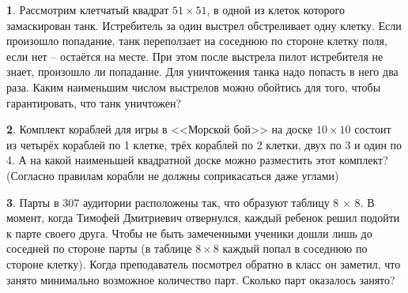 \documentclass[b5paper,usehyperref, twoside]{article}
\theoremstyle{definition}
\theoremstyle{definition}
\newtheorem{Task}{}
\begin{document}
%	
%	
	\begin{Task}
		Рассмотрим клетчатый квадрат $51 \times 51$, в одной из клеток которого замаскирован танк. Истребитель за один выстрел обстреливает одну клетку. Если произошло попадание, танк переползает на соседнюю по стороне клетку поля, если нет – остаётся на месте. При этом после выстрела пилот истребителя не знает, произошло ли попадание. Для уничтожения танка надо попасть в него два раза. Каким наименьшим числом выстрелов можно обойтись для того, чтобы гарантировать, что танк уничтожен? 
	\end{Task}

\begin{Task}
	Комплект кораблей для игры в <<Морской бой>> на доске $10\times 10$ состоит из четырёх кораблей по 1 клетке, трёх кораблей по 2 клетки, двух по 3 и один по 4. А на какой наименьшей квадратной доске можно разместить этот комплект? (Согласно правилам корабли не должны соприкасаться даже углами) 
\end{Task}
	
\begin{Task}
	Парты в 307 аудитории расположены так, что образуют таблицу 8 × 8.
	В момент, когда Тимофей Дмитриевич отвернулся, каждый ребенок решил
	подойти к парте своего друга. Чтобы не быть замеченными ученики дошли лишь до соседней по стороне парты (в таблице $8\times 8$ каждый попал в соседнюю по стороне клетку). Когда преподаватель посмотрел обратно в класс он заметил, что занято минимально возможное количество парт. Сколько парт оказалось занято?
\end{Task}
	
\end{document}
